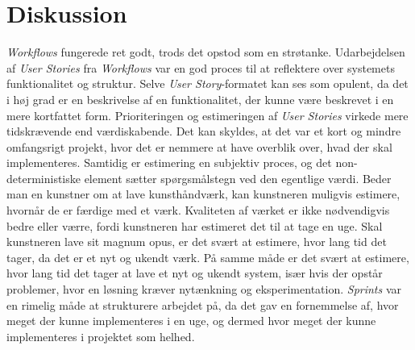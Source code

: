 \section{Diskussion}
\label{sec:conclusion_discussion}
\emph{Workflows} fungerede ret godt, trods det opstod som en strøtanke. Udarbejdelsen af \emph{User Stories} fra \emph{Workflows} var en god proces til at reflektere over systemets funktionalitet og struktur.
Selve \emph{User Story}-formatet kan ses som opulent, da det i høj grad er en beskrivelse af en funktionalitet, der kunne være beskrevet i en mere kortfattet form.
Prioriteringen og estimeringen af \emph{User Stories} virkede mere tidskrævende end værdiskabende. Det kan skyldes, at det var et kort og mindre omfangsrigt projekt, hvor det er nemmere at have overblik over, hvad der skal implementeres.
Samtidig er estimering en subjektiv proces, og det non-deterministiske element sætter spørgsmålstegn ved den egentlige værdi. 
Beder man en kunstner om at lave kunsthåndværk, kan kunstneren muligvis estimere, hvornår de er færdige med et værk. Kvaliteten af værket er ikke nødvendigvis bedre eller værre, fordi kunstneren har estimeret det til at tage en uge.
Skal kunstneren lave sit magnum opus, er det svært at estimere, hvor lang tid det tager, da det er et nyt og ukendt værk. 
På samme måde er det svært at estimere, hvor lang tid det tager at lave et nyt og ukendt system, især hvis der opstår problemer, hvor en løsning kræver nytænkning og eksperimentation.
\emph{Sprints} var en rimelig måde at strukturere arbejdet på, da det gav en fornemmelse af, hvor meget der kunne implementeres i en uge, og dermed hvor meget der kunne implementeres i projektet som helhed.

